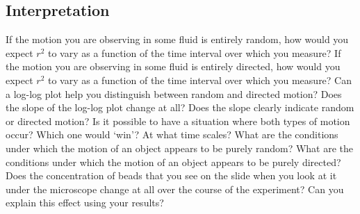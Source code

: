 \subsection*{Interpretation}
If the motion you are observing in some fluid is entirely random, how would you expect $r^{2}$ to vary as a function of the time interval over which you measure? 
If the motion you are observing in some fluid is entirely directed, how would you expect $r^{2}$ to vary as a function of the time interval over which you measure? 
Can a log-log plot help you distinguish between random and directed motion? 
Does the slope of the log-log plot change at all? 
Does the slope clearly indicate random or directed motion? 
Is it possible to have a situation where both types of motion occur? 
Which one would ‘win'? 
At what time scales? 
What are the conditions under which the motion of an object appears to be purely random? 
What are the conditions under which the motion of an object appears to be purely directed? 
Does the concentration of beads that you see on the slide when you look at it under the microscope change at all over the course of the experiment? 
Can you explain this effect using your results?